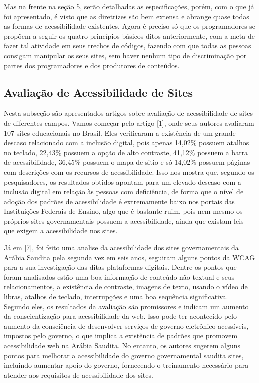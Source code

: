\documentclass[a4paper]{article}
\begin{document}
\begin{titlepage}
Mas na frente na seção 5, serão detalhadas as especificações, porém, com o que já foi apresentado, é visto que as diretrizes são bem extensa e abrange quase todas as formas de acessibilidade existentes. Agora é preciso só que os programadores se propõem a seguir os quatro princípios básicos ditos anteriormente, com a meta de fazer tal atividade em seus trechos de códigos, fazendo com que todas as pessoas consigam manipular os seus sites, sem haver nenhum tipo de discriminação por partes dos programadores e dos produtores de conteúdos.

\subsection{Avaliação de Acessibilidade de Sites}
Nesta subseção são apresentados artigos sobre avaliação de acessibilidade de sites de diferentes campos.  Vamos começar pelo artigo [1], onde seus autores avaliaram 107 sites educacionais no Brasil. Eles verificaram a existência de um grande descaso relacionado com a inclusão digital, pois apenas 14,02\% possuem atalhos no teclado, 22,43\% possuem a opção de alto contraste, 41,12\% possuem a barra de acessibilidade, 36,45\% possuem o mapa de sitio e só 14,02\% possuem páginas com descrições com os recursos de acessibilidade. Isso nos mostra que, segundo os pesquisadores, os resultados obtidos apontam para um elevado descaso com a inclusão digital em relação às pessoas com deficiência, de forma que o nível de adoção dos padrões de acessibilidade é extremamente baixo nos portais das Instituições Federais de Ensino, algo que é bastante ruim, pois nem mesmo os próprios sites governamentais possuem a acessibilidade, ainda que existam leis que exigem a acessibilidade nos sites.

Já em [7], foi feito uma analise da acessibilidade dos sites governamentais da Arábia Saudita pela segunda vez em seis anos, seguiram alguns pontos da WCAG para a sua investigação das ditas plataformas digitais. Dentre os pontos que foram analisados estão uma boa informação de conteúdo não textual e seus relacionamentos, a existência de contraste, imagens de texto, usando o vídeo de libras, atalhos de teclado, interrupções e uma boa sequência significativa. Segundo eles, os resultados da avaliação são promissores e indicam um aumento da conscientização para acessibilidade da web. Isso pode ter acontecido pelo aumento da consciência de desenvolver serviços de governo eletrônico acessíveis, impostos pelo governo, o que implica a existência de padrões que promovem acessibilidade web na Arábia Saudita. No entanto, os autores sugerem alguns pontos para melhorar a acessibilidade do governo governamental saudita sites, incluindo aumentar apoio do governo, fornecendo o treinamento necessário para atender aos requisitos de acessibilidade dos sites.


\end{titlepage}
\end{document}
